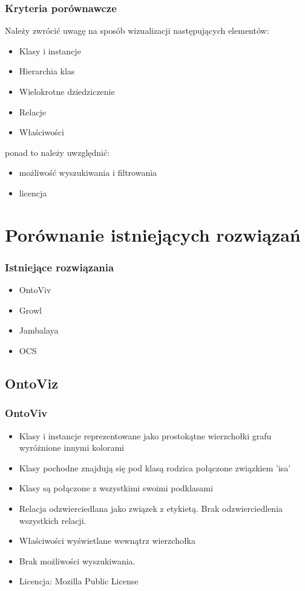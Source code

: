 \documentclass{beamer}
\begin{document}
\begin{frame}
  \frametitle{Kryteria porównawcze}
Należy zwrócić uwagę na sposób wizualizacji następujących elementów:
\begin{itemize}
  \item Klasy i instancje \pause
  \item Hierarchia klas \pause
  \item Wielokrotne dziedziczenie \pause
  \item Relacje \pause
  \item Właściwości \pause
\end{itemize}
ponad to należy uwzględnić:
\begin{itemize}
  \item możliwość wyszukiwania i filtrowania \pause
  \item licencja \pause
\end{itemize}
\end{frame}



\section{Porównanie istniejących rozwiązań}

\begin{frame}
  \frametitle{Istniejące rozwiązania}
  \begin{itemize}
    \item OntoViv
    \item Growl
    \item Jambalaya
    \item OCS
  \end{itemize}

\end{frame}


\subsection{OntoViz}


\begin{frame}
  \frametitle{OntoViv}
  \begin{itemize}
    \item Klasy i instancje reprezentowane jako prostokątne wierzchołki grafu wyróżnione innymi kolorami
    \item Klasy pochodne znajdują się pod klasą rodzica połączone związkiem 'isa'
    \item Klasy są połączone z wszystkimi swoimi podklasami
    \item Relacja odzwierciedlana jako związek z etykietą. Brak odzwierciedlenia wszystkich relacji.
    \item Właściwości wyświetlane wewnątrz wierzchołka
    \item Brak możliwości wyszukiwania.
    \item Licencja: Mozilla Public License
  \end{itemize}

\end{frame}
\end{document}
